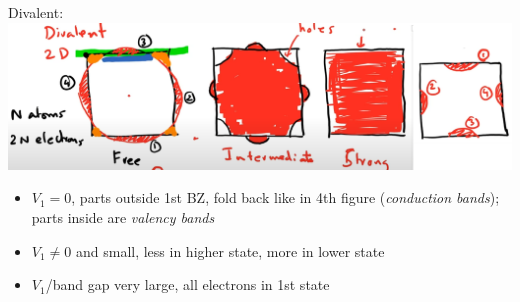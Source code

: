 \documentclass{article}
\theoremstyle{remark}
\theoremstyle{remark}
\begin{document}
\begin{enumerate}
        Divalent:\newline
            \includegraphics*[width=0.8\linewidth]{cmp_Fermi_surface_2d_divalent.png}
            \begin{itemize}
                \item $V_1=0$, parts outside 1st BZ, fold back like in 4th figure (\emph{conduction bands}); parts inside are \emph{valency bands}
                \item $V_1\neq 0$ and small, less in higher state, more in lower state
                \item $V_1$/band gap very large, all electrons in 1st state
            \end{itemize}
        


\end{enumerate}
\end{document}
